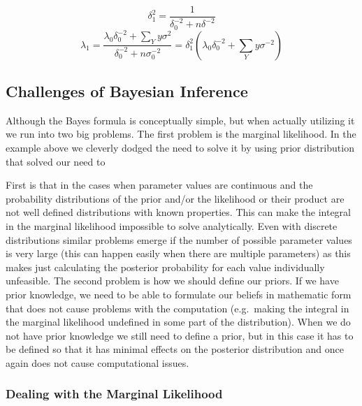 \documentclass[12pt,a4paper,leqno]{report}
\theoremstyle{plain}
\theoremstyle{definition}
\theoremstyle{remark}
\begin{document}
\begin{def}\label{}
    \begin{equation}\label{}
        \delta_1^2
        =
        \frac{1}{\delta_0^{-2}+n\delta^{-2}}
    \end{equation}
    \begin{equation}\label{}
        \lambda_1
        =
        \frac{
            \lambda_0 \delta_0^{-2} + \sum_{Y} y \sigma^2
        }
        {
            \delta_0^{-2} + n \sigma_0^{-2}
        }
        =
        \delta_1^2
        \left(
        \lambda_0 \delta_0^{-2} + \sum_{Y} y \sigma^{-2}
        \right)
    \end{equation}
\end{def}

\subsection{Challenges of Bayesian Inference}\label{bayesproblems}

Although the Bayes formula is conceptually simple, but when actually utilizing it we run into two
big problems. The first problem is the marginal likelihood. In the example above we cleverly
dodged the need to solve it by using prior distribution that solved our need to


First is that in the cases when parameter values are continuous
and the probability distributions of the prior and/or the likelihood or their
product are not well defined distributions with known properties. This can make
the integral in the marginal likelihood impossible to solve analytically.
Even with discrete distributions similar problems emerge if the number of
possible parameter values is very large (this can happen easily when there are multiple
parameters) as this makes just calculating the posterior probability for each value
individually unfeasible. The second problem is how we should define our priors.
If we have prior knowledge, we need to be able to formulate our beliefs in mathematic form that does not cause
problems with the computation (e.g.\ making the integral in the marginal likelihood
undefined in some part of the distribution). When we do not have prior knowledge
we still need to define a prior, but in this case it has to be defined
so that it has minimal effects on the posterior distribution and once
again does not cause computational issues.

\subsubsection{Dealing with the Marginal Likelihood}\label{bayesproblems}
\end{document}
